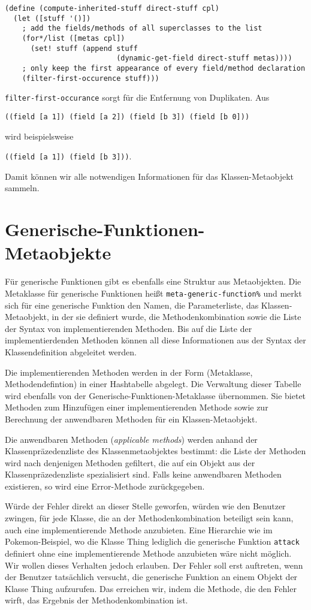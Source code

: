 \begin{lstlisting}
(define (compute-inherited-stuff direct-stuff cpl)
  (let ([stuff '()])
    ; add the fields/methods of all superclasses to the list
    (for*/list ([metas cpl])
      (set! stuff (append stuff 
                          (dynamic-get-field direct-stuff metas))))
    ; only keep the first appearance of every field/method declaration
    (filter-first-occurence stuff)))
\end{lstlisting}

\texttt{filter-first-occurance} sorgt für die Entfernung von Duplikaten. Aus

\texttt{\textquotesingle((field [a 1]) (field [a 2]) (field [b 3]) (field [b 0]))}

wird beispielsweise

\texttt{\textquotesingle((field [a 1]) (field [b 3]))}.

Damit können wir alle notwendigen Informationen für das Klassen-Metaobjekt sammeln.

\section{Generische-Funktionen-Metaobjekte}
Für generische Funktionen gibt es ebenfalls eine Struktur aus Metaobjekten. Die Metaklasse für generische Funktionen heißt \texttt{meta-generic-function\%} und merkt sich für eine generische Funktion den Namen, die Parameterliste, das Klassen-Metaobjekt, in der sie definiert wurde, die Methodenkombination sowie die Liste der Syntax von implementierenden Methoden. Bis auf die Liste der implementierdenden Methoden können all diese Informationen aus der Syntax der Klassendefinition abgeleitet werden.

Die implementierenden Methoden werden in der Form (Metaklasse, Methodendefintion) in einer Hashtabelle abgelegt. Die Verwaltung dieser Tabelle wird ebenfalls von der Generische-Funktionen-Metaklasse übernommen. Sie bietet Methoden zum Hinzufügen einer implementierenden Methode sowie zur Berechnung der anwendbaren Methoden für ein Klassen-Metaobjekt.

Die anwendbaren Methoden (\emph{applicable methods}) werden anhand der Klassenpräzedenzliste des Klassenmetaobjektes bestimmt: die Liste der Methoden wird nach denjenigen Methoden gefiltert, die auf ein Objekt aus der Klassenpräzedenzliste spezialisiert sind. Falls keine anwendbaren Methoden existieren, so wird eine Error-Methode zurückgegeben. 

Würde der Fehler direkt an dieser Stelle geworfen, würden wie den Benutzer zwingen, für jede Klasse, die an der Methodenkombination beteiligt sein kann, auch eine implementierende Methode anzubieten. Eine Hierarchie wie im Pokemon-Beispiel, wo die Klasse Thing lediglich die generische Funktion \texttt{attack} definiert ohne eine implementierende Methode anzubieten wäre nicht möglich. Wir wollen dieses Verhalten jedoch erlauben. Der Fehler soll erst auftreten, wenn der Benutzer tatsächlich versucht, die generische Funktion an einem Objekt der Klasse Thing aufzurufen. Das erreichen wir, indem die Methode, die den Fehler wirft, das Ergebnis der Methodenkombination ist.

